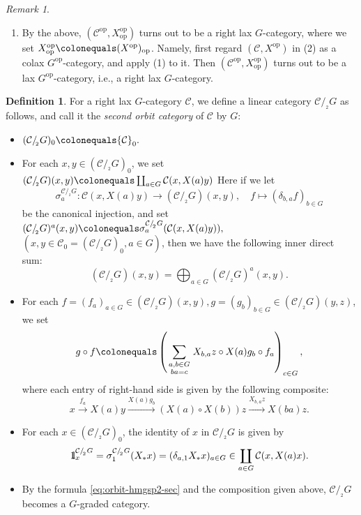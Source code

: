 \documentclass{surv-l}
\numberwithin{equation}{chapter}
\numberwithin{figure}{chapter}
\theoremstyle{plain}
\theoremstyle{definition}
\newtheorem{dfn}[thm]{Definition}
\theoremstyle{remark}
\newtheorem{rmk}[thm]{Remark}
\newcommand{\id}{1\kern-.25em{\text{{\rm l}}}}
\newcommand{\sndorbit}{/\!_{_{2}}}
\begin{document}
\begin{rmk}
\begin{enumerate}
\item
By the above, $({\mathcal{C}}^{\mathrm{op}}, X_\mathrm{op}^{\mathrm{op}})$ turns out to be a right lax $G$-category,
where we set $X_\mathrm{op}^{\mathrm{op}}\colonequals  (X^{\mathrm{op}})_\mathrm{op}$.
Namely, first regard $({\mathcal{C}}, X^{\mathrm{op}})$ in (2) as a colax $G^{\mathrm{op}}$-category,
and apply (1) to it.  Then $({\mathcal{C}}^{\mathrm{op}}, X_\mathrm{op}^{\mathrm{op}})$ turns out to be
a lax $G^{\mathrm{op}}$-category, i.e., a right lax $G$-category.
\end{enumerate}
\end{rmk}

\begin{dfn}
\label{dfn:orbit-cat2}
For a right lax $G$-category ${\mathcal{C}}$, we define a linear category
${\mathcal{C}}\sndorbit G$ as follows, and call it
the \emph{second orbit category} of ${\mathcal{C}}$ by $G$:
\begin{itemize}
\item $({\mathcal{C}}\sndorbit G)_0\colonequals {\mathcal{C}}_0.$
\item
For each $x,y\in({\mathcal{C}}\sndorbit G)_0$, we set
$
({\mathcal{C}}\sndorbit G)(x,y)\colonequals \coprod_{a\in G}{\mathcal{C}}(x, X(a) y)
$
Here if we let
\[
\sigma^{{\mathcal{C}}\sndorbit G}_a\colon {\mathcal{C}}(x, X(a) y) \to ({\mathcal{C}}\sndorbit G)(x,y), \quad f \mapsto (\delta_{b,a} f)_{b \in G}
\]
be the canonical injection, and set
$
({\mathcal{C}}\sndorbit G)^a(x,y)\colonequals \sigma^{{\mathcal{C}}\sndorbit G}_a({\mathcal{C}}(x, X(a) y)),
$
\ $(x,y\in {\mathcal{C}}_0 = ({\mathcal{C}}\sndorbit G)_0, a \in G)$,
then we have the following inner direct sum:
\begin{equation}\label{eq:orbit-hmgsp2-sec}
({\mathcal{C}}\sndorbit G)(x,y)=\bigoplus_{a\in G}({\mathcal{C}}\sndorbit G)^a(x, y).
\end{equation}
\item
For each $f = (f_a)_{a \in G}\in ({\mathcal{C}}\sndorbit G)(x,y),
g = (g_b)_{b\in G} \in ({\mathcal{C}}\sndorbit G)(y,z)$, we set
\[
g \circ f\colonequals \left(\sum_{\begin{smallmatrix}a,b \in G\\ ba=c\end{smallmatrix}}
X_{b,a}z\circ X(a)g_{b}\circ f_{a}
\right)_{c\in G},
\]
where each entry of right-hand side is given by the following composite:
\[
x \xrightarrow{f_a} X(a)y \xrightarrow{X(a)g_b} (X(a)\circ X(b))z \xrightarrow{X_{b,a} z} X(ba)z.
\]
\item
For each $x \in ({\mathcal{C}}\sndorbit G)_0$,
the identity of $x$ in ${\mathcal{C}}\sndorbit G$ is given by
\[
\id_x^{{\mathcal{C}}\sndorbit G} = \sigma^{{\mathcal{C}}\sndorbit G}_1(X_*x) =(\delta_{a, 1}X_*x)_{a \in G} \in \coprod_{a\in G}{\mathcal{C}}(x,X(a) x).
\]
\item
By the formula \eqref{eq:orbit-hmgsp2-sec} and the composition given above,
${\mathcal{C}}\sndorbit G$ becomes a $G$-graded category.
\pagebreak \end{itemize}
\end{dfn}
\end{document}
